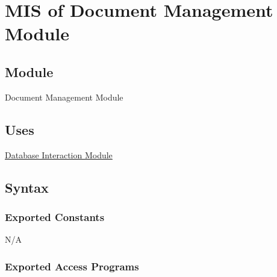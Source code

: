\documentclass[12pt, titlepage]{article}
\begin{document}
{  \newpage

  \section{MIS of Document Management Module}
  \label{sec:DM}

  \subsection{Module}

  Document Management Module

  \subsection{Uses}

  \hyperref[sec:DI]{Database Interaction Module}

  \subsection{Syntax}

  \subsubsection{Exported Constants}
  N/A

  \subsubsection{Exported Access Programs}

}
\end{document}
